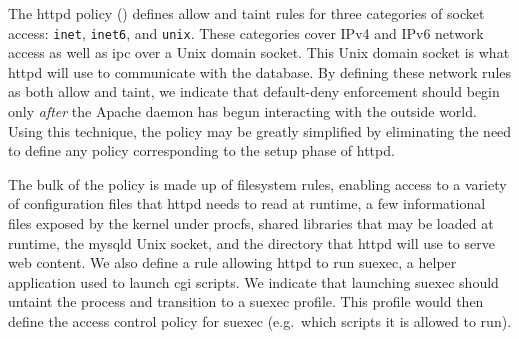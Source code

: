 The httpd policy () defines allow and taint rules for three
categories of socket access: \texttt{inet}, \texttt{inet6}, and \texttt{unix}. These
categories cover IPv4 and IPv6 network access as well as \gls{ipc} over a Unix domain
socket. This Unix domain socket is what httpd will use to communicate with the database.
By defining these network rules as both allow and taint, we indicate that default-deny
enforcement should begin only \textit{after} the Apache daemon has begun interacting with
the outside world. Using this technique, the \bpfbox{} policy may be greatly simplified by
eliminating the need to define any policy corresponding to the setup phase of httpd.

The bulk of the \bpfbox{} policy is made up of filesystem rules, enabling access to
a variety of configuration files that httpd needs to read at runtime, a few informational
files exposed by the kernel under procfs, shared libraries that may be loaded at runtime,
the mysqld Unix socket, and the directory that httpd will use to serve web content. We
also define a rule allowing httpd to run suexec, a helper application used to launch
\gls{cgi} scripts.  We indicate that launching suexec should untaint the process and
transition to a suexec profile.  This profile would then define the access control policy
for suexec (e.g.\ which scripts it is allowed to run).

